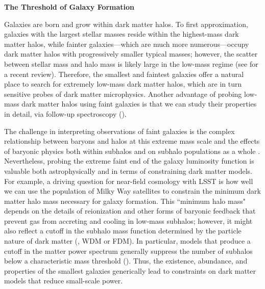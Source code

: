 
\vspace{1em} \noindent \textbf{The Threshold of Galaxy Formation}

Galaxies are born and grow within dark matter halos.
To first approximation, galaxies with the largest stellar masses reside within the highest-mass dark matter halos, while fainter galaxies---which are much more numerous---occupy dark matter halos with progressively smaller typical masses; however, the scatter between stellar mass and halo mass is likely large in the low-mass regime (see \citealt{Wechsler:2018} for a recent review).
Therefore, the smallest and faintest galaxies offer a natural place to search for extremely low-mass dark matter halos, which are in turn sensitive probes of dark matter microphysics. Another advantage of probing low-mass dark matter halos using faint galaxies is that we can study their properties in detail, \eg via follow-up spectroscopy ().

The challenge in interpreting observations of faint galaxies is the complex relationship between baryons and halos at this extreme mass scale and the effects of baryonic physics both within subhalos and on subhalo populations as a whole \citep[\eg,][]{DOnghia:2009xhq,Brooks:2012ah,errani2017,Garrison-Kimmel:2017zes,1811.11791,brooks2018}. Nevertheless, probing the extreme faint end of the galaxy luminosity function is valuable both astrophysically and in terms of constraining dark matter models. For example, a driving question for near-field cosmology with LSST is how well we can use the population of Milky Way satellites to constrain the minimum dark matter halo mass necessary for galaxy formation. 
This ``minimum halo mass" depends on the details of reionization and other forms of baryonic feedback that prevent gas from accreting and cooling in low-mass subhalos; however, it might also reflect a cutoff in the subhalo mass function determined by the particle nature of dark matter (\eg, WDM or FDM). In particular, models that produce a cutoff in the matter power spectrum generally suppress the number of subhalos below a characteristic mass threshold (). Thus, the existence, abundance, and properties of the smallest galaxies generically lead to constraints on dark matter models that reduce small-scale power.

\vspace{1em} 

